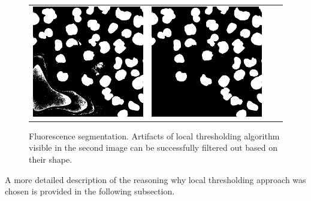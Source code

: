 \begin{figure}[htb]
\begin{tabularx}{\textwidth}{YYYY}
            \includegraphics{bilder/segmentation/nuclei-mask/filled_holes.png} &
            \includegraphics{bilder/segmentation/nuclei-mask/mask.png}
        \end{tabularx}
    \caption[Fluorescence segmentation]%
    {Fluorescence segmentation. Artifacts of local thresholding algorithm visible in the second image can be successfully filtered out based on their shape.}
    \label{fig:segmentation-nuclei-steps}
\end{figure}

A more detailed description of the reasoning why local thresholding approach was chosen is provided in the following subsection.
